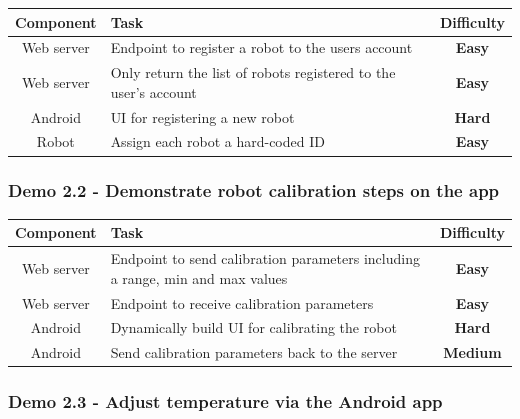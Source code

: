 \documentclass[onecolumn]{IEEEtran}
\newcommand{\easy}{{\color{green} \textbf{Easy}}}
\newcommand{\medium}{{\color{orange} \textbf{Medium}}}
\newcommand{\hard}{{\color{red} \textbf{Hard}}}
\begin{document}
\begin{center}
    \begin{tabularx}{0.8\linewidth}{|c|L|c|}
        \hline
        \textbf{Component} & \textbf{Task} & \textbf{Difficulty} \\
        \hline
        Web server & Endpoint to register a robot to the users account & \easy \\
        \hline
        Web server & Only return the list of robots registered to the user's account & \easy \\
        \hline
        Android & UI for registering a new robot & \hard \\
        \hline
        Robot & Assign each robot a hard-coded ID & \easy \\
        \hline
    \end{tabularx}
\end{center}

\subsubsection{Demo 2.2 - Demonstrate robot calibration steps on the app}

\begin{center}
    \begin{tabularx}{0.8\linewidth}{|c|L|c|}
        \hline
        \textbf{Component} & \textbf{Task} & \textbf{Difficulty} \\
        \hline
        Web server & Endpoint to send calibration parameters including a range, min and max values & \easy \\
        \hline
        Web server & Endpoint to receive calibration parameters & \easy \\
        \hline
        Android & Dynamically build UI for calibrating the robot & \hard \\
        \hline
        Android & Send calibration parameters back to the server & \medium \\
        \hline
    \end{tabularx}
\end{center}

\subsubsection{Demo 2.3 - Adjust temperature via the Android app}
\end{document}
